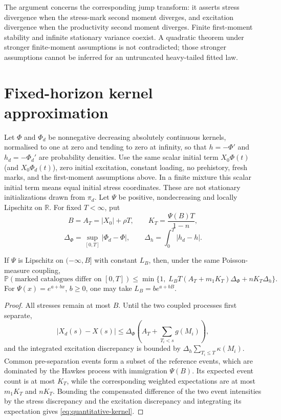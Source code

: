 The argument concerns the corresponding jump transform: it asserts stress divergence when the stress-mark second moment diverges, and excitation divergence when the productivity second moment diverges. Finite first-moment stability and infinite stationary variance coexist. A quadratic theorem under stronger finite-moment assumptions is not contradicted; those stronger assumptions cannot be inferred for an untruncated heavy-tailed fitted law.

\section{Fixed-horizon kernel approximation}

Let \(\Phi\) and \(\Phi_d\) be nonnegative decreasing absolutely continuous kernels, normalised to one at zero and tending to zero at infinity, so that \(h=-\Phi'\) and \(h_d=-\Phi_d'\) are probability densities. Use the same scalar initial term \(X_0\Phi(t)\) (and \(X_0\Phi_d(t)\)), zero initial excitation, constant loading, no prehistory, fresh marks, and the first-moment assumptions above. In a finite mixture this scalar initial term means equal initial stress coordinates. These are not stationary initializations drawn from \(\pi_d\). Let \(\Psi\) be positive, nondecreasing and locally Lipschitz on \(\mathbb R\). For fixed \(T<\infty\), put
\[
B=A_T=|X_0|+\rho T,\qquad
K_T=\frac{\Psi(B)T}{1-n},
\]
\[
\Delta_\Phi=\sup_{[0,T]}|\Phi_d-\Phi|,
\qquad
\Delta_h=\int_0^T|h_d-h|.
\]

\begin{proposition}\label{prop:quantitative-kernel}
If \(\Psi\) is Lipschitz on \((-\infty,B]\) with constant \(L_B\), then, under the same Poisson-measure coupling,
\begin{equation}\label{eq:quantitative-kernel}
\mathbb P(\text{marked catalogues differ on }[0,T])
\leq\min\{1,\;L_BT(A_T+m_1K_T)\Delta_\Phi+nK_T\Delta_h\}.
\end{equation}
For \(\Psi(x)=e^{a+bx}\), \(b\geq0\), one may take \(L_B=be^{a+bB}\).
\end{proposition}

\begin{proof}
All stresses remain at most \(B\). Until the two coupled processes first separate,
\[
|X_d(s)-X(s)|
\leq\Delta_\Phi\left(A_T+\sum_{T_i<s}g(M_i)\right),
\]
and the integrated excitation discrepancy is bounded by
\(\Delta_h\sum_{T_i\leq T}\kappa(M_i)\). Common pre-separation events form a subset of the reference events, which are dominated by the Hawkes process with immigration \(\Psi(B)\). Its expected event count is at most \(K_T\), while the corresponding weighted expectations are at most \(m_1K_T\) and \(nK_T\). Bounding the compensated difference of the two event intensities by the stress discrepancy and the excitation discrepancy and integrating its expectation gives \eqref{eq:quantitative-kernel}.
\end{proof}

